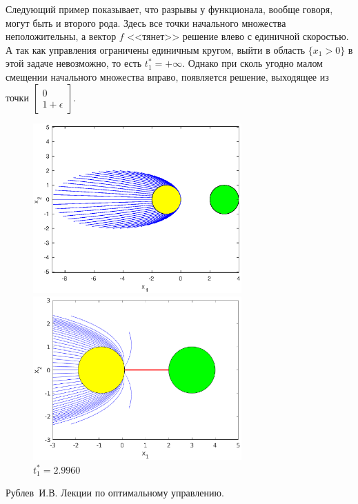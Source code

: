 \documentclass[11pt]{article}
\newcommand\Cl[2]{\begin{bmatrix}
#1 \\ #2
\end{bmatrix}}
\begin{document}
Следующий пример показывает, что разрывы у функционала, вообще говоря, могут быть и второго рода.
Здесь все точки начального множества неположительны, а вектор $f$ <<тянет>> решение влево с единичной
скоростью. А так как управления ограничены единичным кругом, выйти в область $\{x_1 > 0\}$ в
этой задаче невозможно, то есть $t_1^* = +\infty$. Однако при сколь угодно малом смещении начального
множества вправо, появляется решение, выходящее из точки $\Cl{0}{1+\epsilon}$.
\begin{figure}[h]
\begin{multicols}{2}
	\hfill
	\includegraphics[width=80mm]{4_1.eps}
	\hfill
	\caption{$t_1^* = +\infty$}
	\hfill
	\includegraphics[width=80mm]{4_2.eps}
	\hfill
	\caption{$t_1^* = 2.9960$}
\end{multicols}
\end{figure}

\newpage
\begin{thebibliography}{0}
	Рублев~И.В. Лекции по оптимальному управлению.
\end{thebibliography}
\end{document}

